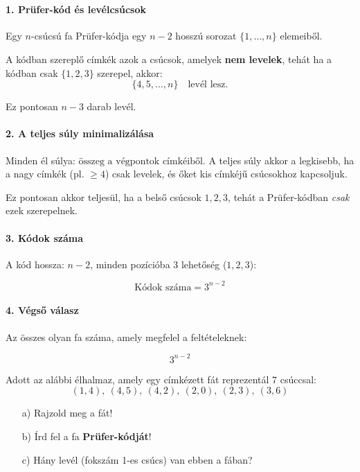 \begin{solution}
	~
	
	\paragraph{1. Prüfer-kód és levélcsúcsok}
	
	Egy $n$-csúcsú fa Prüfer-kódja egy $n-2$ hosszú sorozat $\{1,\dots,n\}$
	elemeiből.
	
	A kódban szereplő címkék azok a csúcsok, amelyek \textbf{nem levelek},
	tehát ha a kódban csak $\{1,2,3\}$ szerepel, akkor: 
	\[
	\{4,5,\dots,n\}\quad\text{levél lesz.}
	\]
	
	Ez pontosan $n-3$ darab levél.
	
	\paragraph{2. A teljes súly minimalizálása}
	
	Minden él súlya: $\text{összeg a végpontok címkéiből}$. A teljes
	súly akkor a legkisebb, ha a nagy címkék (pl. $\geq4$) csak levelek,
	és őket kis címkéjű csúcsokhoz kapcsoljuk.
	
	Ez pontosan akkor teljesül, ha a belső csúcsok $1,2,3$, tehát a Prüfer-kódban
	\emph{csak} ezek szerepelnek.
	
	\paragraph{3. Kódok száma}
	
	A kód hossza: $n-2$, minden pozícióba 3 lehetőség ($1,2,3$):
	
	\[
	\text{Kódok száma}=3^{n-2}
	\]
	
	\paragraph{4. Végső válasz}
	
	Az összes olyan fa száma, amely megfelel a feltételeknek:
	
	\[
	\boxed{3^{n-2}}
	\]
\end{solution}
\begin{extraproblem}
	Adott az alábbi élhalmaz, amely egy címkézett fát reprezentál 7 csúccsal:
	\[
	(1,4),\ (4,5),\ (4,2),\ (2,0),\ (2,3),\ (3,6)
	\]
	\begin{enumerate}
		\item[a)] Rajzold meg a fát! 
		\item[b)] Írd fel a fa \textbf{Prüfer-kódját}! 
		\item[c)] Hány levél (fokszám 1-es csúcs) van ebben a fában? 
	\end{enumerate}
\end{extraproblem}
